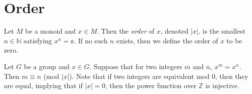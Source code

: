 \section{Order}

\begin{definition}
    \label{definition : order}
    \leanok
    Let $M$ be a monoid and $x \in M$. Then the \textit{order} of $x$, denoted $|x|$, is the smallest $n \in \mathbb{N}$ satisfying $x^n = \mathbb{e}$. If no such $n$ exists, then we define the order of $x$ to be zero.
\end{definition}

\begin{theorem}
    \label{theorem : mod_order_eq_of_gpow_eq}
    \leanok
    Let $G$ be a group and $x \in G$. Suppose that for two integers $m$ and $n$,
    $x^m = x^n$. Then $m \equiv n$ (mod $|x|$). Note that if two integers
    are equivalent mod 0, then they are equal, implying that if $|x| = 0$, then
    the power function over $\mathbb{Z}$ is injective.
\end{theorem}
